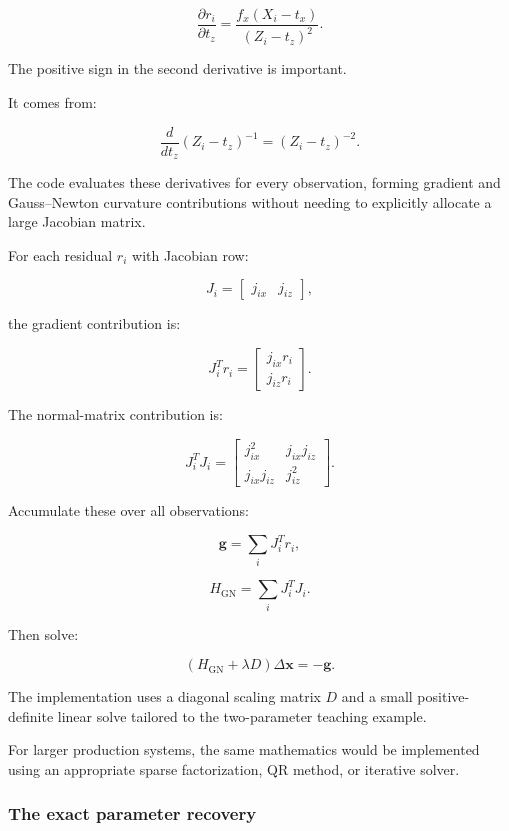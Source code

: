 \[
\boxed{ \frac{\partial r_i}{\partial t_z} = \frac{f_x(X_i-t_x)}{(Z_i-t_z)^2} }.
\]

The positive sign in the second derivative is important.

It comes from:

\[
\frac d{dt_z}(Z_i-t_z)^{-1} = (Z_i-t_z)^{-2}.
\]

The code evaluates these derivatives for every observation, forming gradient and Gauss--Newton curvature contributions without needing to explicitly allocate a large Jacobian matrix.

For each residual \(r_i\) with Jacobian row:

\[
J_i= \begin{bmatrix} j_{ix}&j_{iz} \end{bmatrix},
\]

the gradient contribution is:

\[
J_i^Tr_i= \begin{bmatrix} j_{ix}r_i\\ j_{iz}r_i \end{bmatrix}.
\]

The normal-matrix contribution is:

\[
J_i^TJ_i= \begin{bmatrix} j_{ix}^2&j_{ix}j_{iz}\\ j_{ix}j_{iz}&j_{iz}^2 \end{bmatrix}.
\]

Accumulate these over all observations:

\[
\mathbf g=\sum_iJ_i^Tr_i,
\]

\[
H_{\mathrm{GN}}=\sum_iJ_i^TJ_i.
\]

Then solve:

\[
(H_{\mathrm{GN}}+\lambda D)\Delta\mathbf x=-\mathbf g.
\]

The implementation uses a diagonal scaling matrix \(D\) and a small positive-definite linear solve tailored to the two-parameter teaching example.

For larger production systems, the same mathematics would be implemented using an appropriate sparse factorization, QR method, or iterative solver.

\subsubsection{The exact parameter recovery}\label{02-foundations-ii-ch028-the-exact-parameter-recovery}

\hypertarget{02-foundations-ii-ch028-the-exact-parameter-recovery}{}

